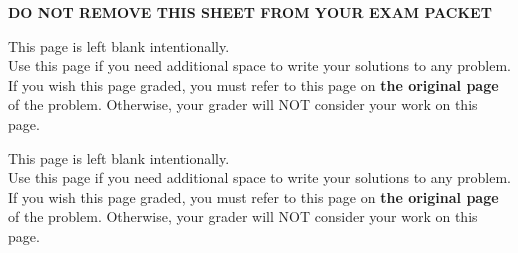\documentclass[11pt]{article}
\begin{document}
\begin{enumerate}
\begin{center}
{\bf DO NOT REMOVE THIS SHEET FROM YOUR EXAM PACKET}
\end{center}

\newpage

This page is left blank intentionally.\\

Use this page if you need additional space to write your solutions to any problem. \\

If you wish this page graded, you must refer to this page on \textbf{the original page} of the problem. Otherwise, your grader will NOT consider your work on this page.

\newpage

This page is left blank intentionally.\\

Use this page if you need additional space to write your solutions to any problem. \\

If you wish this page graded, you must refer to this page on \textbf{the original page} of the problem. Otherwise, your grader will NOT consider your work on this page.

\end{enumerate}
\end{document}
